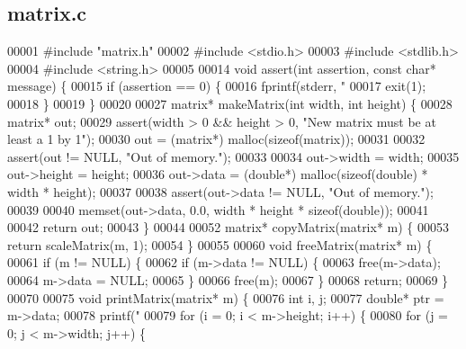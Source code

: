\subsection{matrix.\+c}
\label{matrix_8c_source}

\begin{DoxyCode}
00001 \textcolor{preprocessor}{#include "matrix.h"}
00002 \textcolor{preprocessor}{#include <stdio.h>}
00003 \textcolor{preprocessor}{#include <stdlib.h>}
00004 \textcolor{preprocessor}{#include <string.h>}
00005 
00014 \textcolor{keywordtype}{void} assert(\textcolor{keywordtype}{int} assertion, \textcolor{keyword}{const} \textcolor{keywordtype}{char}* message) \{
00015     \textcolor{keywordflow}{if} (assertion == 0) \{
00016         fprintf(stderr, \textcolor{stringliteral}{"%
00017         exit(1);
00018     \}
00019 \}
00020 
00027 matrix* makeMatrix(\textcolor{keywordtype}{int} width, \textcolor{keywordtype}{int} height) \{
00028     matrix* out;
00029     assert(width > 0 && height > 0, \textcolor{stringliteral}{"New matrix must be at least a 1 by 1"});
00030     out = (matrix*) malloc(\textcolor{keyword}{sizeof}(matrix));
00031 
00032     assert(out != NULL, \textcolor{stringliteral}{"Out of memory."});
00033 
00034     out->width = width;
00035     out->height = height;
00036     out->data = (\textcolor{keywordtype}{double}*) malloc(\textcolor{keyword}{sizeof}(\textcolor{keywordtype}{double}) * width * height);
00037 
00038     assert(out->data != NULL, \textcolor{stringliteral}{"Out of memory."});
00039 
00040     memset(out->data, 0.0, width * height * \textcolor{keyword}{sizeof}(\textcolor{keywordtype}{double}));
00041 
00042     \textcolor{keywordflow}{return} out;
00043 \}
00044 
00052 matrix* copyMatrix(matrix* m) \{
00053     \textcolor{keywordflow}{return} scaleMatrix(m, 1);
00054 \}
00055 
00060 \textcolor{keywordtype}{void} freeMatrix(matrix* m) \{
00061     \textcolor{keywordflow}{if} (m != NULL) \{
00062         \textcolor{keywordflow}{if} (m->data != NULL) \{
00063             free(m->data);
00064             m->data = NULL;
00065         \}
00066         free(m);
00067     \}
00068     \textcolor{keywordflow}{return};
00069 \}
00070 
00075 \textcolor{keywordtype}{void} printMatrix(matrix* m) \{
00076     \textcolor{keywordtype}{int} i, j;
00077     \textcolor{keywordtype}{double}* ptr = m->data;
00078     printf(\textcolor{stringliteral}{"%
00079     \textcolor{keywordflow}{for} (i = 0; i < m->height; i++) \{
00080         \textcolor{keywordflow}{for} (j = 0; j < m->width; j++) \{
}}
\end{DoxyCode}
